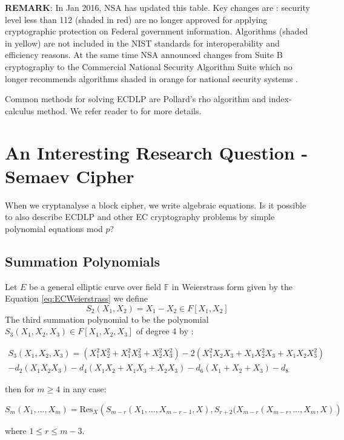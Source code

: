 \textbf{REMARK}: In Jan 2016, NSA has updated this table. Key changes are \cite{NSA16key}: security level less than 112 (shaded in red) are no longer approved for applying cryptographic protection on Federal government information. Algorithms (shaded in yellow) are not included in the NIST standards for interoperability and efficiency reasons. At the same time NSA announced changes from Suite B cryptography to the Commercial National Security Algorithm Suite which no longer recommends algorithms shaded in orange for national security systems \cite{NSA16}.

Common methods for solving ECDLP are Pollard’s rho algorithm and index-calculus method. We refer reader to \cite{hankerson2006guide,petit2016algebraic} for more details.
\section{An Interesting Research Question - Semaev Cipher}
When we cryptanalyse a block cipher, we write algebraic equations. Is it possible to also describe ECDLP and other EC cryptography problems by simple polynomial equations mod $p$?
\subsection{Summation Polynomials} \label{sec:summationPoly} 
Let $E$ be a general elliptic curve over field $\mathbb{F}$ in Weierstrass form given by the Equation \ref{eq:ECWeierstrass} we define $$ S_{2}\left( X_1,X_2\right)  = X_1-X_2 \in F\left[ X_1,X_2 \right] $$ The third summation polynomial to be the polynomial $S_{3}\left( X_1,X_2,X_3\right)  \in F \left[ X_1,X_2,X_3\right]$ of degree 4 by  \cite{kosters2015notes}: 
\begin{small}
	\begin{multline}\label{eq:general_Semaev}
	S_{3}\left( X_1,X_2,X_3 \right) =\left( X_1^2X_2^2+X_1^2X_3^2+X_2^2X_3^2\right) - 2\left( X_1^2X_2X_3+X_1X_2^2X_3+X_1X_2X_3^2\right)\\
	-d_2\left(X_1X_2X_3 \right) -d_4\left(X_1X_2+X_1X_3+X_2X_3 \right) -d_6\left( X_1+X_2+X_3\right) -d_8
	\end{multline}
\end{small}
then for $m \geq 4 $ in any case: \\
\begin{small}
$$S_m(X_1,\dots,X_m)=\text{Res}_X\left( S_{m-r}\left(X_1,\dots, X_{m-r-1},X \right), S_{r+2}(X_{m-r}\left( X_{m-r},\dots,X_m,X\right)  \right) $$
\end{small}
where $1 \leq r \leq m-3$.

